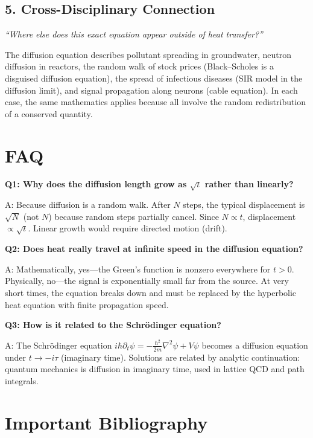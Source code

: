 \subsection*{5. Cross-Disciplinary Connection}
\textit{``Where else does this exact equation appear outside of heat transfer?''}

The diffusion equation describes pollutant spreading in groundwater, neutron diffusion in reactors, the random walk of stock prices (Black--Scholes is a disguised diffusion equation), the spread of infectious diseases (SIR model in the diffusion limit), and signal propagation along neurons (cable equation). In each case, the same mathematics applies because all involve the random redistribution of a conserved quantity.


\section*{FAQ}

\textbf{Q1: Why does the diffusion length grow as $\sqrt{t}$ rather than linearly?}

A: Because diffusion is a random walk. After $N$ steps, the typical displacement is $\sqrt{N}$ (not $N$) because random steps partially cancel. Since $N \propto t$, displacement $\propto \sqrt{t}$. Linear growth would require directed motion (drift).

\textbf{Q2: Does heat really travel at infinite speed in the diffusion equation?}

A: Mathematically, yes---the Green's function is nonzero everywhere for $t > 0$. Physically, no---the signal is exponentially small far from the source. At very short times, the equation breaks down and must be replaced by the hyperbolic heat equation with finite propagation speed.

\textbf{Q3: How is it related to the Schr\"odinger equation?}

A: The Schr\"odinger equation $i\hbar \partial_t \psi = -\frac{\hbar^2}{2m}\nabla^2 \psi + V\psi$ becomes a diffusion equation under $t \to -i\tau$ (imaginary time). Solutions are related by analytic continuation: quantum mechanics is diffusion in imaginary time, used in lattice QCD and path integrals.
\section*{Important Bibliography}


